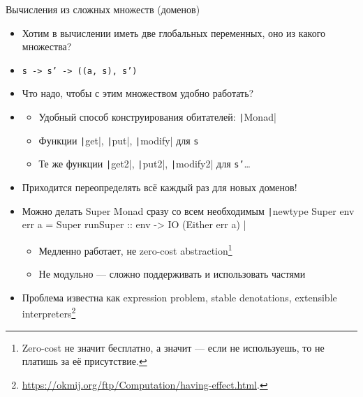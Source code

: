     \begin{frame}[fragile]{Вычисления из сложных множеств (доменов)}
        \begin{itemize}
            \item[\todo] Хотим в вычислении иметь две глобальных переменных, оно из какого множества?
            \item[\answer] \pause \texttt{s -> s' -> ((a, s), s')}
            \item[\todo] Что надо, чтобы с этим множеством удобно работать?
            \item[\answer] \pause
            \begin{itemize}
                \item Удобный способ конструирования обитателей: \texttt|Monad|
                \item Функции \texttt|get|, \texttt|put|, \texttt|modify| для \texttt{s}
                \item Те же функции \texttt|get2|, \texttt|put2|, \texttt|modify2| для \texttt{s'}\ldots
            \end{itemize}
            \item[\NB] Приходится переопределять всё каждый раз для новых доменов!
            \item Можно делать Super Monad сразу со всем необходимым \texttt|newtype Super env err a = Super { runSuper :: env -> IO (Either err a) }|
            \begin{itemize}
                \item[\negative] Медленно работает, не zero-cost abstraction\footnote{Zero-cost не значит бесплатно, а значит --- если не используешь, то не платишь за её присутствие.}
                \item[\negative] Не модульно --- сложно поддерживать и использовать частями
            \end{itemize}
            \item Проблема известна как expression problem, stable denotations, extensible interpreters\footnote{\color{blue} \url{https://okmij.org/ftp/Computation/having-effect.html}.}
        \end{itemize}
    \end{frame}

